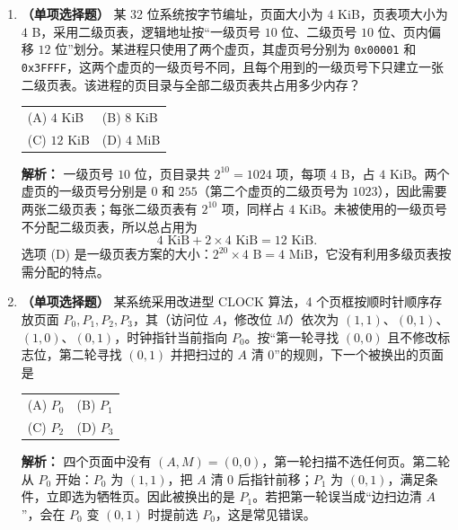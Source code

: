\begin{enumerate}[start=7]

\item \textbf{（单项选择题）} 某 32 位系统按字节编址，页面大小为 $4$ KiB，页表项大小为 $4$ B，采用二级页表，逻辑地址按“一级页号 $10$ 位、二级页号 $10$ 位、页内偏移 $12$ 位”划分。某进程只使用了两个虚页，其虚页号分别为 \texttt{0x00001} 和 \texttt{0x3FFFF}，这两个虚页的一级页号不同，且每个用到的一级页号下只建立一张二级页表。该进程的页目录与全部二级页表共占用多少内存？
\begin{center}
\begin{tabular}{ll}
(A) $4$ KiB & (B) $8$ KiB \\[4pt]
(C) $12$ KiB & (D) $4$ MiB
\end{tabular}
\end{center}

\ifshowsolutions\par\noindent\textbf{解析：} 一级页号 $10$ 位，页目录共 $2^{10}=1024$ 项，每项 $4$ B，占 $4$ KiB。两个虚页的一级页号分别是 $0$ 和 $255$（第二个虚页的二级页号为 $1023$），因此需要两张二级页表；每张二级页表有 $2^{10}$ 项，同样占 $4$ KiB。未被使用的一级页号不分配二级页表，所以总占用为
\[
4\text{ KiB}+2\times4\text{ KiB}=12\text{ KiB}.
\]
选项 (D) 是一级页表方案的大小：$2^{20}\times4\text{ B}=4$ MiB，它没有利用多级页表按需分配的特点。\else \answerarea \fi

\item \textbf{（单项选择题）} 某系统采用改进型 CLOCK 算法，4 个页框按顺时针顺序存放页面 $P_0,P_1,P_2,P_3$，其（访问位 $A$，修改位 $M$）依次为 $(1,1)$、$(0,1)$、$(1,0)$、$(0,1)$，时钟指针当前指向 $P_0$。按“第一轮寻找 $(0,0)$ 且不修改标志位，第二轮寻找 $(0,1)$ 并把扫过的 $A$ 清 $0$”的规则，下一个被换出的页面是
\begin{center}
\begin{tabular}{ll}
(A) $P_0$ & (B) $P_1$ \\[4pt]
(C) $P_2$ & (D) $P_3$
\end{tabular}
\end{center}

\ifshowsolutions\par\noindent\textbf{解析：} 四个页面中没有 $(A,M)=(0,0)$，第一轮扫描不选任何页。第二轮从 $P_0$ 开始：$P_0$ 为 $(1,1)$，把 $A$ 清 $0$ 后指针前移；$P_1$ 为 $(0,1)$，满足条件，立即选为牺牲页。因此被换出的是 $P_1$。若把第一轮误当成“边扫边清 $A$”，会在 $P_0$ 变 $(0,1)$ 时提前选 $P_0$，这是常见错误。\else \answerarea \fi


\end{enumerate}
